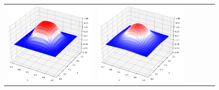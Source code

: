 \documentclass[12pt, reqno]{report}
\theoremstyle{definition}
\theoremstyle{remark}
\begin{document}
\begin{figure}[H]
\begin{tabular}{rccccc}
        \includegraphics[align = c, height=\subheight]{media_paper/surf_FD_n=200.png} &
        \includegraphics[align = c, height=\subheight]{media_paper/surf_FD_n=500.png} &

\end{tabular}
\end{figure}
\end{document}
